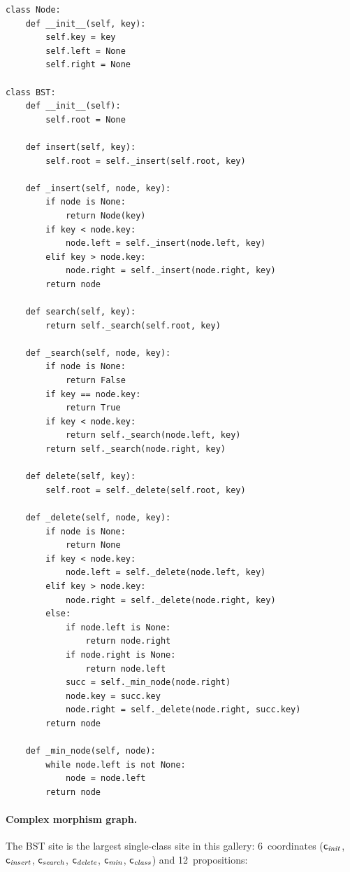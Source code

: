 \begin{lstlisting}[style=jugeo-python,caption={Binary search tree.},label={lst:bst}]
class Node:
    def __init__(self, key):
        self.key = key
        self.left = None
        self.right = None

class BST:
    def __init__(self):
        self.root = None

    def insert(self, key):
        self.root = self._insert(self.root, key)

    def _insert(self, node, key):
        if node is None:
            return Node(key)
        if key < node.key:
            node.left = self._insert(node.left, key)
        elif key > node.key:
            node.right = self._insert(node.right, key)
        return node

    def search(self, key):
        return self._search(self.root, key)

    def _search(self, node, key):
        if node is None:
            return False
        if key == node.key:
            return True
        if key < node.key:
            return self._search(node.left, key)
        return self._search(node.right, key)

    def delete(self, key):
        self.root = self._delete(self.root, key)

    def _delete(self, node, key):
        if node is None:
            return None
        if key < node.key:
            node.left = self._delete(node.left, key)
        elif key > node.key:
            node.right = self._delete(node.right, key)
        else:
            if node.left is None:
                return node.right
            if node.right is None:
                return node.left
            succ = self._min_node(node.right)
            node.key = succ.key
            node.right = self._delete(node.right, succ.key)
        return node

    def _min_node(self, node):
        while node.left is not None:
            node = node.left
        return node
\end{lstlisting}

\paragraph{Complex morphism graph.}
The BST site is the largest single-class site in this gallery:
6~coordinates ($\mathsf{c}_{\mathit{init}}$, $\mathsf{c}_{\mathit{insert}}$,
$\mathsf{c}_{\mathit{search}}$, $\mathsf{c}_{\mathit{delete}}$,
$\mathsf{c}_{\mathit{min}}$, $\mathsf{c}_{\mathit{class}}$) and
12~propositions:

